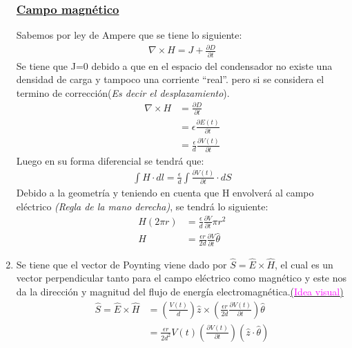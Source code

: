 \documentclass[
  11pt,
  letterpaper,
   addpoints,
   answers
  ]{exam}
\begin{document}
\begin{questions}
\begin{solution}
\begin{enumerate}
            \subsubsection*{\underline{Campo magnético}}
            Sabemos por ley de Ampere que se tiene lo siguiente:
            \begin{align}
                \nabla \times H = J + \frac{\partial D}{\partial t}
            \end{align}
            Se tiene que J=0 debido a que en el espacio del condensador no existe una densidad de carga y tampoco una corriente ``real''. pero  si se considera el termino de corrección(\textit{Es decir el desplazamiento}).
            \begin{align}
                \nabla \times H &= \frac{\partial D}{\partial t}\\
                                &= \epsilon \frac{\partial E(t)}{\partial t}\\
                                &= \frac{\epsilon}{d}\frac{\partial V(t)}{\partial t}
            \end{align}
            Luego en su forma diferencial se tendrá que:
            \begin{align}
                \int H \cdot dl = \frac{\epsilon}{d}\int \frac{\partial V(t)}{\partial t} \cdot dS
            \end{align}
            Debido a la geometría y teniendo en cuenta que H envolverá al campo eléctrico \textit{(Regla de la mano derecha)}, se tendrá lo siguiente:
            \begin{align}
                H (2\pi r) &= \frac{\epsilon}{d} \frac{\partial V}{\partial t} \pi r^{2}\\
                H &= \frac{\epsilon r}{2d} \frac{\partial V}{\partial t} \hat{\theta}
            \end{align}
            \item Se tiene que el vector de Poynting viene dado por $\hat{S} = \hat{E} \times \hat{H}$, el cual es un vector perpendicular tanto para el campo eléctrico como magnético y este nos da la dirección y magnitud del flujo de energía electromagnética.\href{http://jnaudin.free.fr/html/pft01.htm}{(\textcolor{magenta}{Idea visual})}
            \begin{align}
                \hat{S} = \hat{E} \times \hat{H} &= \left(\frac{V(t)}{d}\right) \hat{z} \times \left(\frac{\epsilon r}{2d}\frac{\partial V(t)}{\partial t}\right) \hat{\theta}\\
                &= \frac{\epsilon r}{2d^{2}} V(t) \left(\frac{\partial V(t)}{\partial t}\right) (\hat{z} \cdot \hat{\theta})\\

\end{align}
\end{enumerate}
\end{solution}
\end{questions}
\end{document}
